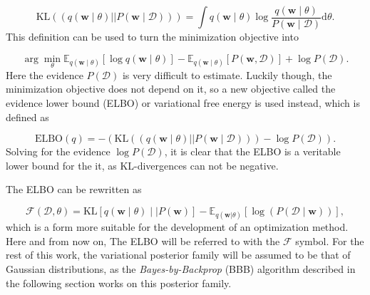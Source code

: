 	\begin{equation}
	\mathrm{KL}((q(\pmb{w} \mid \theta) ||P(\pmb{w} \mid \mathcal{D}))) = \int q(\pmb{w} \mid \theta) \log \frac{q(\pmb{w} \mid \theta)}{P(\pmb{w} \mid \mathcal{D})} \mathrm{d}\theta.
	\end{equation}
	This definition can be used to turn the minimization objective into 
	
	\begin{equation}
		\arg \min_{\theta}
		\mathbb{E}_{q(\pmb{w} \mid \theta)}[\log q(\pmb{w} \mid \theta)] -
		\mathbb{E}_{q(\pmb{w} \mid \theta)}[P(\pmb{w},\mathcal{D})] + 
		\log P(\mathcal{D}).
	\end{equation} 
	 Here the evidence $P(\mathcal{D})$ is very difficult to estimate. Luckily though, the minimization objective does not depend on it, so a new objective called the evidence lower bound (ELBO) or variational free energy is used instead, which is defined as 
	 
	 \begin{equation}
	 	\text{ELBO}(q) = -(\mathrm{KL}((q(\pmb{w}\mid\theta) ||P(\pmb{w}\mid\mathcal{D}))) - \log P(\mathcal{D})).
	 \end{equation}
	 Solving for the evidence $\log P(\mathcal{D})$, it is clear that the ELBO is a veritable lower bound for the it, as KL-divergences can not be negative.  

	The ELBO can be rewritten as
	
	\begin{equation}
	\label{eq:elbo}
		\mathcal{F}(\mathcal{D}, \theta) = 
		\mathrm{KL}[q(\pmb{w}\mid\theta) \mid\mid P(\pmb{w})] - \mathbb{E}_{q(\pmb{w}|\theta)}[\log(P(\mathcal{D} \mid \pmb{w}))],
	\end{equation}
	which is a form more suitable for the development of an optimization method. Here and from now on, The ELBO will be referred to with the $\mathcal{F}$ symbol. For the rest of this work, the variational posterior family will be assumed to be that of Gaussian distributions, as the \textit{Bayes-by-Backprop} (BBB) algorithm described in the following section works on this posterior family. 
	
